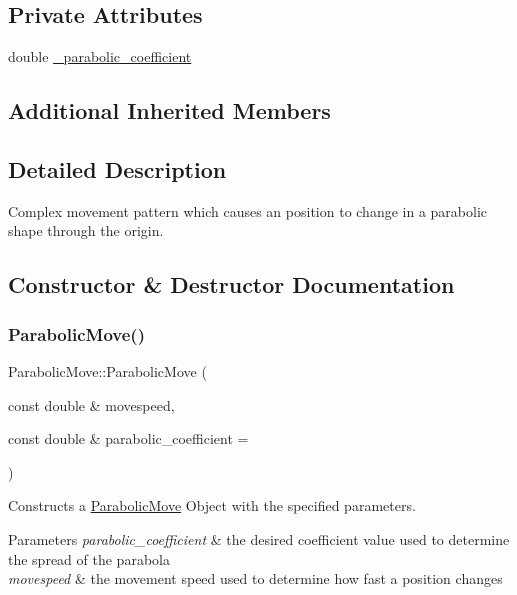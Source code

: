 \subsection*{Private Attributes}
\begin{DoxyCompactItemize}
\item 
double \hyperlink{class_parabolic_move_a4ae7c298df76cb1a0f5f7d6f85c0977c}{\+\_\+parabolic\+\_\+coefficient}
\end{DoxyCompactItemize}
\subsection*{Additional Inherited Members}


\subsection{Detailed Description}
Complex movement pattern which causes an position to change in a parabolic shape through the origin. 

\subsection{Constructor \& Destructor Documentation}
\mbox{\label{class_parabolic_move_abf12528c6594cbdcec66dba3239acdff}} 
\subsubsection{\texorpdfstring{Parabolic\+Move()}{ParabolicMove()}}
{\footnotesize\ttfamily Parabolic\+Move\+::\+Parabolic\+Move (\begin{DoxyParamCaption}\item[{const double \&}]{movespeed,  }\item[{const double \&}]{parabolic\+\_\+coefficient = {} }\end{DoxyParamCaption})}



Constructs a \hyperlink{class_parabolic_move}{Parabolic\+Move} Object with the specified parameters. 


\begin{DoxyParams}{Parameters}
{\em parabolic\+\_\+coefficient} & the desired coefficient value used to determine the spread of the parabola \\
\hline
{\em movespeed} & the movement speed used to determine how fast a position changes \\
\hline
\end{DoxyParams}



